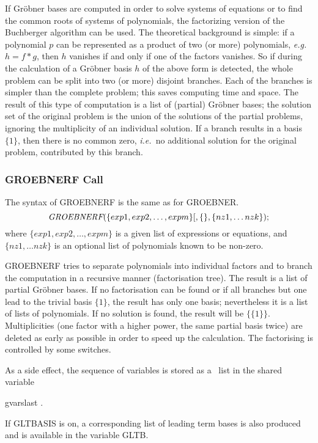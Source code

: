 If Gr\"obner bases are computed in order to solve systems of equations
or to find the common roots of systems of polynomials, the factorizing
version of the Buchberger algorithm can be used.  The theoretical
background is simple: if a polynomial $p$ can be represented as a
product of two (or more) polynomials, {\em e.g.\ } $h= f*g$, then $h$
vanishes if and only if one of the factors vanishes.  So if during the
calculation of a Gr\"obner basis $h$ of the above form is detected,
the whole problem can be split into two (or more) disjoint branches.
Each of the branches is simpler than the complete problem; this saves
computing time and space.  The result of this type of computation is a
list of (partial) Gr\"obner bases; the solution set of the original
problem is the union of the solutions of the partial problems,
ignoring the multiplicity of an individual solution.  If a branch
results in a basis $\{1\}$, then there is no common zero, {\em i.e.\ }no
additional solution for the original problem, contributed by this
branch.

\subsubsection{GROEBNERF Call}
The syntax of GROEBNERF is the same as for GROEBNER.
\[
\mbox{\it GROEBNERF}(\{exp1, exp2, \ldots , expm\}
         [,\{\},\{nz1, \ldots nzk\});
\]
where $\{exp1, exp2, \ldots , expm\} $ is a given list of expressions or
equations, and $\{nz1, \ldots nzk\}$ is
an optional list of polynomials known to be non-zero.

GROEBNERF tries to separate polynomials into individual factors and
to branch the computation in a recursive manner (factorisation tree).
The result is a list of partial Gr\"obner bases.  If no factorisation can
be found or if all branches but one lead to the trivial basis $\{1\}$,
the result has only one basis; nevertheless it is a list of lists of
polynomials.  If no solution is found, the result will be $\{\{1\}\}$.
Multiplicities (one factor with a higher power, the same partial basis
twice) are deleted as early as possible in order to speed up the
calculation.  The factorising is controlled by some switches.

As a side effect, the sequence of variables is stored as a \REDUCE\ list in
the shared variable
\begin{center}
gvarslast .
\end{center}
If GLTBASIS is on, a corresponding list of leading term bases is
also produced and is available in the variable GLTB.

